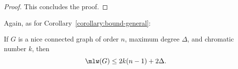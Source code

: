 \documentclass[a4paper,11pt,dvipsnames]{elsarticle}
\newcommand{\commenttext}[1]{ \begin{center} {\fbox{\begin{minipage}[h]{0.9 \linewidth}   {\textsf{ #1}} \end{minipage} }} \end{center}}
\newcommand{\Sam}[1]{{\color{red}\commenttext{Sam : #1}}}
\newcommand{\Rom}[1]{{\color{blue}\commenttext{Rom : #1}}}
\newcommand{\Sam}[1]{}
\newcommand{\Rom}[1]{}
\begin{document}
\begin{proof}
This concludes the proof.
\end{proof}

Again, as for Corollary~\ref{corollary:bound-general}:

\begin{corollary}\label{corollary:bound-chromatic}
If $G$ is a nice connected graph of order $n$, maximum degree $\Delta$, and chromatic number $k$, 
then $$\mlw(G) \leq 2k(n-1)+2\Delta.$$
\end{corollary}
\end{document}
